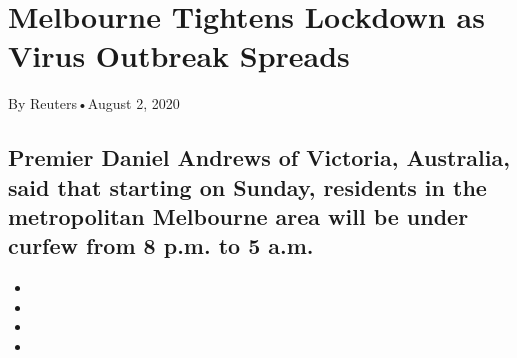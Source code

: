 \hypertarget{melbourne-tightens-lockdown-as-virus-outbreak-spreads-1}{%
\section{Melbourne Tightens Lockdown as Virus Outbreak
Spreads}\label{melbourne-tightens-lockdown-as-virus-outbreak-spreads-1}}

By Reuters•August 2, 2020

\hypertarget{premier-daniel-andrews-of-victoria-australia-said-that-starting-on-sunday-residents-in-the-metropolitan-melbourne-area-will-be-under-curfew-from-8-pm-to-5-am-1}{%
\subsection{Premier Daniel Andrews of Victoria, Australia, said that
starting on Sunday, residents in the metropolitan Melbourne area will be
under curfew from 8 p.m. to 5
a.m.}\label{premier-daniel-andrews-of-victoria-australia-said-that-starting-on-sunday-residents-in-the-metropolitan-melbourne-area-will-be-under-curfew-from-8-pm-to-5-am-1}}

\begin{itemize}
\item
\item
\item
\item
\end{itemize}


